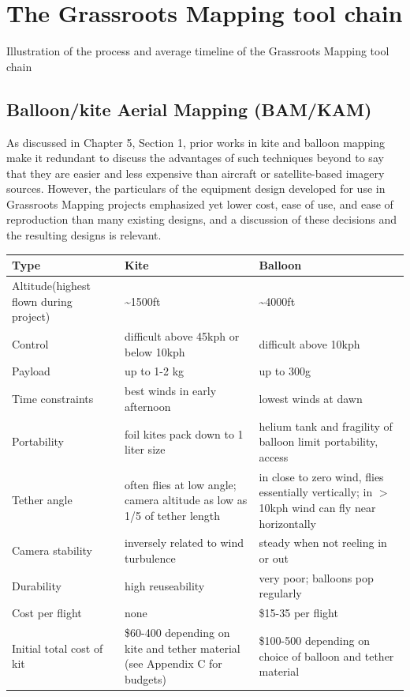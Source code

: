 \documentclass[11pt]{report}
\begin{document}
\chapter{The Grassroots Mapping tool chain}

Illustration of the process and average timeline of the Grassroots Mapping tool chain

\section{Balloon/kite Aerial Mapping (BAM/KAM)}

As discussed in Chapter 5, Section 1, prior works in kite and balloon mapping make it redundant to discuss the advantages of such techniques beyond to say that they are easier and less expensive than aircraft or satellite-based imagery sources. However, the particulars of the equipment design developed for use in Grassroots Mapping projects emphasized yet lower cost, ease of use, and ease of reproduction than many existing designs, and a discussion of these decisions and the resulting designs is relevant. 

\begin{table}
\begin{tabular}{|l|l|l|}
\hline
Type&Kite&Balloon\\
\hline
Altitude{\footnotesize (highest flown during project)}&\~{}1500ft&\~{}4000ft\\
\hline
Control&difficult above 45kph or below 10kph&difficult above 10kph\\
\hline
Payload&up to 1-2 kg&up to 300g\\
\hline
Time constraints&best winds in early afternoon&lowest winds at dawn\\
\hline
Portability&foil kites pack down to 1 liter size&helium tank and fragility of balloon limit portability, access\\
\hline
Tether angle&often flies at low angle; camera altitude as low as 1/5 of tether length&in close to zero wind, flies essentially vertically; in $>$10kph wind can fly near horizontally\\
\hline
Camera stability&inversely related to wind turbulence&steady when not reeling in or out\\
\hline
Durability&high reuseability&very poor; balloons pop regularly\\
\hline
Cost per flight&none&\$15-35 per flight\\
\hline
Initial total cost of kit&\$60-400 depending on kite and tether material (see Appendix C for budgets)&\$100-500 depending on choice of balloon and tether material\\
\hline
\end{tabular}
\end{table}
\end{document}
